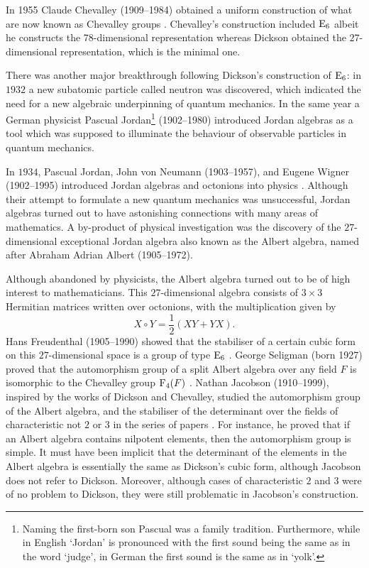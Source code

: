 In 1955 Claude Chevalley (1909--1984) obtained a uniform
construction of what are now known as Chevalley groups 
\cite{Chevalley}. Chevalley's construction included $\mathrm{E}_6$ albeit
he constructs the $78$-dimensional representation whereas
Dickson obtained the $27$-dimensional representation, which is
the minimal one. 

There was another major breakthrough following Dickson's 
construction of $\mathrm{E}_6$: in $1932$ a new subatomic particle called
neutron was discovered, which indicated the need for a new 
algebraic underpinning of quantum mechanics.
In the same year a German physicist 
Pascual Jordan\footnote{
Naming the first-born son Pascual was a family tradition. 
Furthermore, while in English `Jordan' is pronounced with the
first sound being the same as in the word `judge', in German
the first sound is the same as in `yolk'.
} (1902--1980) introduced Jordan algebras as a tool which was 
supposed to illuminate the behaviour of observable particles 
in quantum mechanics. 

In $1934$, Pascual Jordan, John von Neumann (1903--1957), 
and Eugene Wigner (1902--1995) introduced Jordan 
algebras and octonions into physics \cite{JordanNeumannWigner}. 
Although their attempt to formulate a new quantum mechanics was
unsuccessful, Jordan algebras turned out to have astonishing 
connections with many areas of mathematics. A by-product of
physical investigation was the discovery of the $27$-dimensional
exceptional Jordan algebra also known as the Albert algebra, named 
after Abraham Adrian Albert (1905--1972).

Although abandoned by physicists, the Albert algebra turned out
to be of high interest to mathematicians. This $27$-dimensional
algebra consists of $3\times 3$ Hermitian matrices written 
over octonions, with the multiplication given by
\begin{equation}
X\circ Y = \frac12 (XY + YX).	
\end{equation}
Hans Freudenthal (1905--1990) showed that the stabiliser
of a certain cubic form on this $27$-dimensional space is a 
group of type $\mathrm{E}_6$ \cite{Freudenthal}. 
George Seligman (born 1927) proved that the 
automorphism group of a split Albert algebra over any field
$F$ is isomorphic to the Chevalley group $\mathrm{F}_4(F)$ 
\cite{Seligman}. Nathan Jacobson (1910--1999), 
inspired by the works of Dickson and
Chevalley, studied the automorphism 
group of the
Albert algebra, and the stabiliser of the determinant over the
fields of characteristic not $2$ or $3$ in the series of papers
\cite{JacobsonOne,JacobsonTwo,JacobsonThree}. For instance, he 
proved that if an Albert algebra contains nilpotent elements, 
then the automorphism group is simple. It must have been 
implicit that the
determinant of the elements in the Albert algebra is essentially
the same as Dickson's cubic form, although Jacobson does not refer
to Dickson. Moreover, although cases of characteristic $2$ and $3$
were of no problem to Dickson, they were still problematic in
Jacobson's construction.

